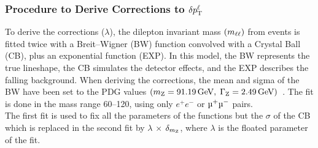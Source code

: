 \subsubsection{Procedure to Derive Corrections to $\delta p_{\mathrm{T}}^{\ell}$}
To derive the corrections ($\lambda$), the dilepton invariant mass $\left( m_{\ell\ell} \right)$ from \ztolplm events is fitted twice with a Breit--Wigner (BW) function convolved with a Crystal Ball (CB), plus an exponential function (EXP).
In this model, the BW represents the true \mZ lineshape, the CB simulates the detector effects, and the EXP describes the falling background.
When deriving the corrections, the mean and sigma of the BW have been set to the PDG values $\left( m_{\text{Z}} = 91.19\,\text{Ge\hspace{-.08em}V}, \; \Gamma_{\text{Z}} = 2.49\,\text{Ge\hspace{-.08em}V} \right)$~\cite{particle_data_group_review_2020}.
 The fit is done in the mass range 60--120\GeV, using only $e^{+}e^{-}$ or $\Pmu^{+}\Pmu^{-}$ pairs.\\
The first fit is used to fix all the parameters of the functions but the $\sigma$ of the CB which is
replaced in the second fit by $\lambda$ $\times$ $\delta_{m_{\text{Z}}}$, where $\lambda$ is the 
floated parameter of the fit. 

